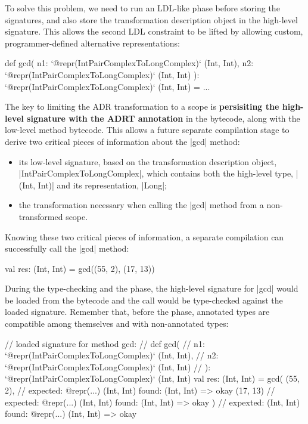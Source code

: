 To solve this problem, we need to run an LDL-like \inject{} phase before storing the signatures, and also store the transformation description object in the high-level signature. This allows the second LDL constraint to be lifted by allowing custom, programmer-defined alternative representations:

\begin{lstlisting-nobreak}
def gcd(
    n1: `@repr(IntPairComplexToLongComplex)` (Int, Int),
    n2: `@repr(IntPairComplexToLongComplex)` (Int, Int)
  ): `@repr(IntPairComplexToLongComplex)` (Int, Int) = ...
\end{lstlisting-nobreak}


The key to limiting the ADR transformation to a scope is \textbf{persisiting the high-level signature with the ADRT annotation} in the bytecode, along with the low-level method bytecode. This allows a future separate compilation stage to derive two critical pieces of information about the |gcd| method:

\begin{itemize}
  \item its low-level signature, based on the transformation description object, \\ |IntPairComplexToLongComplex|, which contains both the high-level type, |(Int, Int)| and its representation, |Long|;
  \item the transformation necessary when calling the |gcd| method from a non-transformed scope.
\end{itemize}

Knowing these two critical pieces of information, a separate compilation can successfully call the |gcd| method:

\begin{lstlisting-nobreak}
val res: (Int, Int) = gcd((55, 2), (17, 13))
\end{lstlisting-nobreak}

During the type-checking and the \inject{} phase, the high-level signature for |gcd| would be loaded from the bytecode and the call would be type-checked against the loaded signature. Remember that, before the \coerce{} phase, annotated types are compatible among themselves and with non-annotated types:

\begin{lstlisting-nobreak}
// loaded signature for method gcd:
//  def gcd(
//      n1: `@repr(IntPairComplexToLongComplex)` (Int, Int),
//      n2: `@repr(IntPairComplexToLongComplex)` (Int, Int)
//    ): `@repr(IntPairComplexToLongComplex)` (Int, Int)
val res: (Int, Int) =
  gcd(
    (55, 2),   // expected: @repr(...) (Int, Int) found: (Int, Int) => okay
    (17, 13)  // expected: @repr(...) (Int, Int) found: (Int, Int) => okay
  )             // expexted: (Int, Int) found: @repr(...) (Int, Int) => okay
\end{lstlisting-nobreak}

